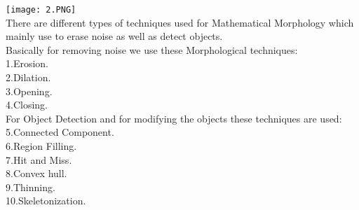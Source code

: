 \documentclass[10pt,a4paper]{article}
\begin{document}
\texttt{[image: 2.PNG]}\\
There are different types of techniques used for Mathematical Morphology which mainly use to erase noise as well as detect objects.\\  
Basically for removing noise we use these Morphological techniques:\\
1.Erosion. \\
2.Dilation. \\
3.Opening.\\
4.Closing. \\
For Object Detection and for modifying the objects these techniques are used:\\    
5.Connected Component.\\
6.Region Filling.  \\
7.Hit and Miss. \\
8.Convex hull. \\
9.Thinning. \\
10.Skeletonization.\\
 
\end{document}
